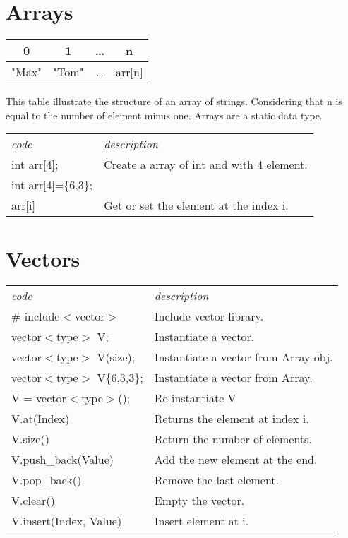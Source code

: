 \documentclass[5pt]{article}
\begin{document}
\begin{multicols}{2}
\section{Arrays}
\begin{tabular}{c|c|c|c }
 0 & 1 & … & n \\ 
 \hline
 "Max" & "Tom" & … & arr$[$n$]$
\end{tabular}
This table illustrate the structure of an array of strings. Considering that n is equal to the number of element minus one. Arrays are a static data type.\\[6pt]
\begin{tabular}{ll}
\emph{code}         & \emph{description}\\
int arr[4];         & Create a array of int and with 4 element.\\
int arr[4]=\{6,3\}; & \\
arr$[$i$]$          & Get or set the element at the index i.\\
\end{tabular}


\section{Vectors}
\begin{tabular}{ll}
\emph{code}                     & \emph{description}\\
\# include$<$vector$>$          & Include vector library.\\
vector$<$type$>$ V;             & Instantiate a vector.\\
vector$<$type$>$ V(size);       & Instantiate a vector from Array obj.\\
vector$<$type$>$ V\{6,3,3\};    & Instantiate a vector from Array.\\
V = vector$<$type$>$();         & Re-instantiate V\\
V.at(Index)                     & Returns the element at index i.\\
V.size()                        & Return the number of elements.\\
V.push\_back(Value)             & Add the new element at the end.\\
V.pop\_back()                   & Remove the last element.\\
V.clear()                       & Empty the vector.\\
V.insert(Index, Value)          & Insert element at i.
\end{tabular}



\end{multicols}
\end{document}
